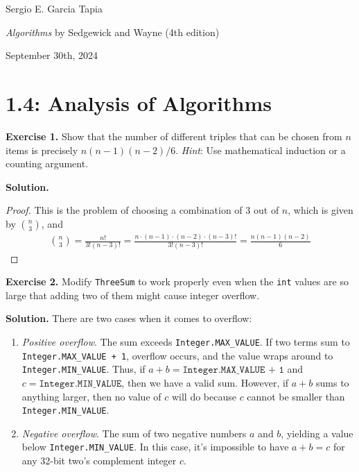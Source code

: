 \documentclass[12pt, a4paper]{article}
\newenvironment{ex}[2][Exercise]
{\par\medskip\noindent \textbf{#1 #2.}}
{\medskip}
\newenvironment{sol}[1][Solution]
{\par\medskip\noindent \textbf{#1.} }
{\medskip}
\begin{document}
	\noindent Sergio E. Garcia Tapia \hfill
	
	\noindent \emph{Algorithms} by Sedgewick and Wayne (4th edition) \cite{sedgewick_wayne}\hfill
	
	\noindent September 30th, 2024\hfill 
	\section*{1.4: Analysis of Algorithms}
	\begin{ex}{1}
		Show that the number of different triples that can be chosen from $n$ items is
		precisely $n(n-1)(n-2)/6$. \emph{Hint}: Use mathematical induction  or a counting argument.
	\end{ex}
	\begin{sol}
		\begin{proof}
			This is the problem of choosing a combination of $3$ out of $n$, which is given
			by $\binom{n}{3}$, and
			\begin{align*}
				\binom{n}{3} = \frac{n!}{3!(n-3)!}=\frac{n\cdot (n-1)\cdot (n-2)\cdot (n-3)!}{3!(n-3)!}  = \frac{n(n-1)(n-2)}{6}
			\end{align*}
		\end{proof}
	\end{sol}
	\begin{ex}{2}
		Modify \texttt{ThreeSum} to work properly even when the \texttt{int} values are so
		large that adding two of them might cause integer overflow.
	\end{ex}
	\begin{sol}
		There are two cases when it comes to overflow:
		\begin{enumerate}[label=(\roman*)]
			\item \emph{Positive overflow}. The sum exceeds \texttt{Integer.MAX\_VALUE}.
			If two terms sum to \texttt{Integer.MAX\_VALUE + 1}, overflow occurs, and
			the value wraps around to \texttt{Integer.MIN\_VALUE}. Thus, if
			$a + b = \texttt{Integer.MAX\_VALUE + 1}$ and $c = \texttt{Integer.MIN\_VALUE}$,
			then we have a valid sum. However, if $a+b$ sums to anything larger, then
			no value of $c$ will do because $c$ cannot be smaller than \texttt{Integer.MIN\_VALUE}.
			\item \emph{Negative overflow}. The sum of two negative numbers $a$ and $b$, yielding
			a value below \texttt{Integer.MIN\_VALUE}. In this case, it's impossible to have
			$a + b = c$ for any 32-bit two's complement integer $c$.
		\end{enumerate}
	\end{sol}
	
	\pagebreak
	\printbibliography
\end{document}
